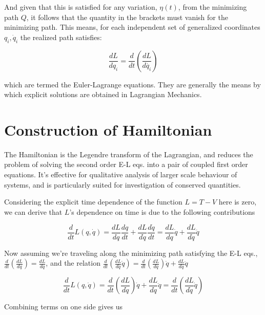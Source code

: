 \documentclass{article}\usepackage[]{graphicx}\usepackage[]{color}
\begin{document}
And given that this is satisfied for any variation, $\eta(t)$, from the minimizing path $Q$, it follows that the quantity in the brackets must vanish for the minimizing path. This means, for each independent set of generalized coordinates $q_i, \dot{q}_i$ the realized path satisfies:

\begin{equation}
 \frac{dL}{dq_i} = \frac{d}{dt}\left( \frac{dL}{d\dot{q_i}}\right) 
\end{equation}

which are termed the Euler-Lagrange equations. They are generally the means by which explicit solutions are obtained in Lagrangian Mechanics.




\section{Construction of Hamiltonian}

The Hamiltonian is the Legendre transform of the Lagrangian, and reduces the problem of solving the second order E-L eqs. into a pair of coupled first order equations. It's effective for qualitative analysis of larger scale behaviour of systems, and is particularly suited for investigation of conserved quantities.



Considering the explicit time dependence of the function 
$L=T-V$ here is zero, we can derive that $L$'s dependence on time is due to the following contributions

$$
\frac{d}{dt}L(q,\dot{q})=
\frac{dL}{dq}\frac{dq}{dt}+
\frac{dL}{d\dot{q}}\frac{d\dot{q}}{dt}=
\frac{dL}{dq}\dot{q}+
\frac{dL}{d\dot{q}}\ddot{q}
$$

Now assuming we're traveling along the minimizing path satisfying the E-L eqs., $\frac{d}{dt}\left( \frac{dL}{d\dot{q}}\right) =\frac{dL}{dq}$, and the relation $\frac{d}{dt}\left( \frac{dL}{d\dot{q}}\dot{q}\right) =\frac{d}{dt}\left( \frac{dL}{d\dot{q}} \right) \dot{q}+\frac{dL}{d\dot{q}}\ddot{q}$

$$
\frac{d}{dt}L(q,\dot{q})=\frac{d}{dt}\left( \frac{dL}{d\dot{q}} \right) \dot{q}+\frac{dL}{d\dot{q}}\ddot{q}=\frac{d}{dt}
\left( \frac{dL}{d\dot{q}}\dot{q}\right)
$$

Combining terms on one side gives us
\end{document}

